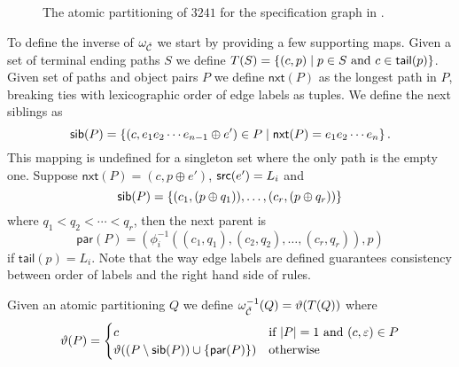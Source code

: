 \begin{figure}[ht!]
    \centering
    
    \caption{The atomic partitioning of $3241$ for the specification graph in .}
    \label{fig:atomic_partitioning}
\end{figure}

To define the inverse of $\omega_{\check{\mathcal{C}}}$ we start by providing a few supporting maps. Given a set of terminal ending paths $S$ we define $T(S) = \left\{(c,p) \mid p \in S \text{ and } c \in \textsf{tail}(p)\right\}$. Given set of paths and object pairs $P$ we define $\textsf{nxt}(P)$ as the longest path in $P$, breaking ties with lexicographic order of edge labels as tuples. We define the next siblings as
\[
    \textsf{sib}(P) = \left\{(c, e_1e_2 \dotsm e_{n-1} \oplus e') \in P \mid \textsf{nxt}(P) = e_1e_2 \dotsm e_n\right\}.
\]
This mapping is undefined for a singleton set where the only path is the empty one. Suppose $\textsf{nxt}(P) = (c, p \oplus e')$, $\textsf{src}(e') = L_i$ and 
\[
    \textsf{sib}(P) = \left\{(c_1, (p \oplus q_1)),\dotsc, (c_r, (p \oplus q_r))\right\}
\]
where $q_1 < q_2 < \dotsm < q_r$, then the next parent is
\[
    \textsf{par}(P) = (\phi^{-1}_i((c_1,q_1), (c_2,q_2), \dotsc, (c_r,q_r)),p)
\]
if $\textsf{tail}(p) = L_i$. Note that the way edge labels are defined guarantees consistency between order of labels and the right hand side of rules.

Given an atomic partitioning $Q$ we define $\omega^{-1}_{\check{\mathcal{C}}}(Q) = \vartheta(T(Q))$ where
\[
    \vartheta(P) = \begin{cases}
        c & \text{if } |P| = 1 \text{ and } (c, \varepsilon) \in P\\
        \vartheta(\left(P \setminus \textsf{sib}(P)\right) \cup \left\{\textsf{par}(P)\right\}) & \text{otherwise}
    \end{cases}
\]

